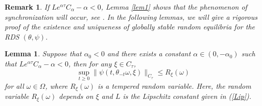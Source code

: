 \documentclass[preprint,12pt]{elsarticle}
\newtheorem{lemma}{Lemma}[section]
\newtheorem{remark}{Remark}[section]
\begin{document}
\begin{remark}
{\rm If $Le^{\alpha\tau}C_\alpha-\alpha<0$, Lemma \ref{lem1} shows that the phenomenon of synchronization will occur, see \cite{CK,FGS1,FGS2}. In the following lemmas, we will give a rigorous proof of the existence and uniqueness of globally stable random equilibria for the RDS $(\theta,\psi)$. }
\end{remark}

\begin{lemma}\label{lem2}
Suppose that $\alpha_0<0$ and there exists a constant $\alpha\in(0,-\alpha_0)$ such that $Le^{\alpha\tau}C_\alpha-\alpha<0$, then for any $\xi\in C_\tau$,
\begin{equation}\label{Conclu8}
\sup_{t\geq0}\|\psi(t,\theta_{-t}\omega,\xi)\|_{C_\tau}\leq R_\xi(\omega)
\end{equation}
for all $\omega\in\Omega$, where $R_\xi(\omega)$ is a tempered random variable. Here, the random variable $R_\xi(\omega)$ depends on $\xi$ and $L$ is the Lipschitz constant given in (\ref{Lip}).
\end{lemma}
\end{document}
